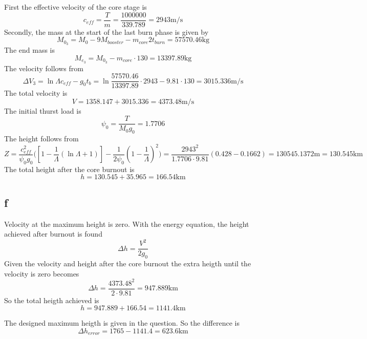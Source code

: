 First the effective velocity of the core stage is
\begin{equation}
c_{eff} = \frac{T}{m} = \frac{1000000}{339.789} = 2943 \text{m/s}
\end{equation}
Secondly, the mass at the start of the last burn phase is given by
\begin{equation}
M_{0_3} = M_0 - 9M_{booster}-m_{core}2t_{burn} = 57570.46 \text{kg}
\end{equation}
The end mass is 
\begin{equation}
M_{e_3} = M_{0_3} - m_{core}\cdot130 = 13397.89 \text{kg}
\end{equation}
The velocity follows from
\begin{equation}
\Delta V_3 = \ln\Lambda c_{eff}-g_0t_b = \ln\frac{57570.46}{13397.89} \cdot2943-9.81\cdot130= 3015.336\text{m/s}
\end{equation}
The total velocity is 
\begin{equation}
V = 1358.147+3015.336 = 4373.48 \text{m/s}
\end{equation}
The initial thurst load is 
\begin{equation}
\psi_0 = \frac{T}{M_0g_0}  = 1.7706
\end{equation}
The height follows from
\begin{equation}
Z = \frac{c_{eff}^2}{\psi_0g_0}\Bigg([1-\frac{1}{\Lambda}(\ln\Lambda+1)]-\frac{1}{2\psi_0}(1-\frac{1}{\Lambda})^2\Bigg) = \frac{2943^2}{1.7706\cdot9.81}(0.428-0.1662) = 130545.1372 \text{m} = 130.545 \text{km}
\end{equation}
The total height after the core burnout is
\begin{equation}
h = 130.545  + 35.965 = 166.54 \text{km}
\end{equation}

\subsection{f}
Velocity at the maximum height is zero. With the energy equation, the height achieved after burnout is found
\begin{equation}
\Delta h = \frac{V^2}{2g_0}
\end{equation}
Given the velocity and height after the core burnout
the extra heigth until the velocity is zero becomes
\begin{equation}
\Delta h = \frac{4373.48^2}{2\cdot9.81}=947.889 \text{km}
\end{equation}
So the total heigth achieved is 
\begin{equation}
h = 947.889+ 166.54 = 1141.4 \text{km}
\end{equation}

The designed maximum heigth is given in the question. So the difference is
\begin{equation}
\Delta h_{error} = 1765 - 1141.4 = 623.6 \text{km}
\end{equation}